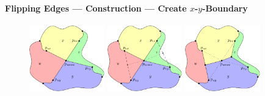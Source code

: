 \documentclass[t,18pt]{beamer}
\newcommand{\emdash}{---}
\begin{document}
\begin{frame}[c]
  \frametitle{}
  \framesubtitle{Flipping Edges \emdash{} Construction \emdash{} Create $x$-$y$-Boundary}
  \begin{figure}
    \includegraphics[width=3.25cm]{../Thesis/Resources/FlipEdge-StretchBoundary-1.pdf}
    \quad
    \includegraphics[width=3.25cm]{../Thesis/Resources/FlipEdge-StretchBoundary-2.pdf}
    \quad
    \includegraphics[width=3.25cm]{../Thesis/Resources/FlipEdge-StretchBoundary-3.pdf}
  \end{figure}
\end{frame}
\end{document}
